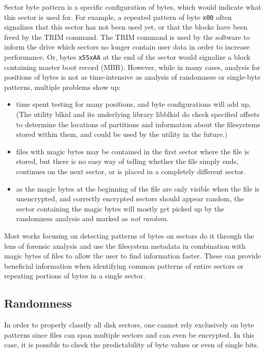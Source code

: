 \documentclass[
  digital, %
  color,   %
  oneside, %
  lof,     %
  nolot,     %
]{fithesis4}
\begin{document}
Sector byte pattern is a specific configuration of bytes, which would indicate what this sector is used for.
For example, a repeated pattern of byte \texttt{x00} often signalizes that this sector has not been used yet, or that the blocks have been freed by the TRIM command.
The TRIM command is used by the software to inform the drive which sectors no longer contain user data in order to increase performance.\cite{mcmillen21}
Or, bytes \texttt{x55xAA} at the end of the sector would signalize a block containing master boot record (MBR).
However, while in many cases, analysis for positions of bytes is not as time-intensive as analysis of randomness or single-byte patterns, multiple problems show up:
\begin{itemize}
    \item time spent testing for many positions, and byte configurations will add up,
    (The utility blkid\cite{blkid} and its underlying library libblkid\cite{libblkid} do check specified offsets to determine the locations of partitions and information about the filesystems stored within them, and could be used by the utility in the future.)
    \item files with magic bytes may be contained in the first sector where the file is stored, but there is no easy way of telling whether the file simply ends, continues on the next sector, or is placed in a completely different sector.
    \item as the magic bytes at the beginning of the file are only visible when the file is unencrypted, and correctly encrypted sectors should appear random, the sector containing the magic bytes will mostly get picked up by the randomness analysis and marked as \emph{not random}. 
\end{itemize}

Most works focusing on detecting patterns of bytes on sectors\cite{foster12, garfmccar15} do it through the lens of forensic analysis and use the filesystem metadata in combination with magic bytes of files to allow the user to find information faster.
These can provide beneficial information when identifying common patterns of entire sectors or repeating portions of bytes in a single sector.\cite{foster12}

\subsection{Randomness}
\label{ssec:randomness}
In order to properly classify all disk sectors, one cannot rely exclusively on byte patterns since files can span multiple sectors and can even be encrypted.
In this case, it is possible to check the predictability of byte values or even of single bits.
\end{document}
